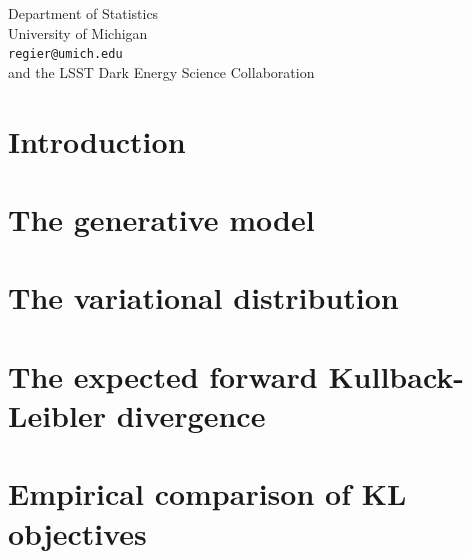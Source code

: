 \documentclass{article}
\begin{document}
{	Department of Statistics \\
	University of Michigan\\
	\texttt{regier@umich.edu} \\
	\And \textnormal{and the} LSST Dark Energy Science Collaboration
}

\date{}

\maketitle

\begin{abstract}%

\end{abstract}

\section{Introduction}
\label{sec:intro}


\section{The generative model}
\label{sec:gen_model}


\section{The variational distribution}
\label{sec:var_inference}


\section{The expected forward Kullback-Leibler divergence}
\label{sec:wake_sleep}




\section{Empirical comparison of KL objectives}

\end{document}
